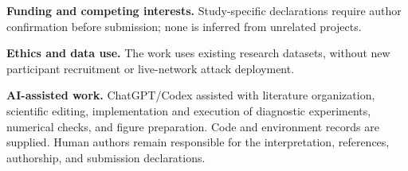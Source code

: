 \noindent\textbf{Funding and competing interests.} Study-specific declarations require author confirmation before submission; none is inferred from unrelated projects.

\noindent\textbf{Ethics and data use.} The work uses existing research datasets, without new participant recruitment or live-network attack deployment.

\noindent\textbf{AI-assisted work.} ChatGPT/Codex assisted with literature organization, scientific editing, implementation and execution of diagnostic experiments, numerical checks, and figure preparation. Code and environment records are supplied. Human authors remain responsible for the interpretation, references, authorship, and submission declarations.

\FloatBarrier
\begingroup\footnotesize\raggedright

\endgroup

